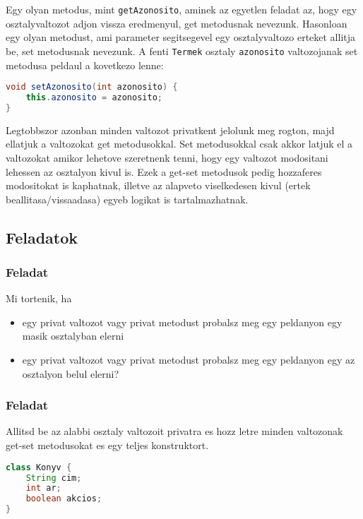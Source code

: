 \documentclass{article}
\let\l\lstinline
\begin{document}
Egy olyan metodus, mint \l{getAzonosito}, aminek az egyetlen feladat az, hogy egy osztalyvaltozot adjon vissza eredmenyul, get metodusnak nevezunk. Hasonloan egy olyan metodust, ami parameter segitsegevel egy osztalyvaltozo erteket allitja be, set metodusnak nevezunk. A fenti \l{Termek} osztaly \l{azonosito} valtozojanak set metodusa peldaul a kovetkezo lenne:

\begin{lstlisting}[language=Java, caption=Pelda set metodus]
void setAzonosito(int azonosito) {
    this.azonosito = azonosito;
}
\end{lstlisting}

Legtobbszor azonban minden valtozot privatkent jelolunk meg rogton, majd ellatjuk a valtozokat get metodusokkal. Set metodusokkal csak akkor latjuk el a valtozokat amikor lehetove szeretnenk tenni, hogy egy valtozot modositani lehessen az osztalyon kivul is. Ezek a get-set metodusok pedig hozzaferes modositokat is kaphatnak, illetve az alapveto viselkedesen kivul (ertek beallitasa/vissaadasa) egyeb logikat is tartalmazhatnak.

\subsection{Feladatok}

\subsubsection{Feladat}
Mi tortenik, ha
\begin{itemize}
    \item egy privat valtozot vagy privat metodust probalsz meg egy peldanyon egy masik osztalyban elerni
    \item egy privat valtozot vagy privat metodust probalsz meg egy peldanyon egy az osztalyon belul elerni?
\end{itemize}

\subsubsection{Feladat}

Allitsd be az alabbi osztaly valtozoit privatra es hozz letre minden valtozonak get-set metodusokat es egy teljes konstruktort.


\begin{lstlisting}[language=Java, caption=Feladat]
class Konyv {
    String cim;
    int ar;
    boolean akcios;
}
\end{lstlisting}
\end{document}
